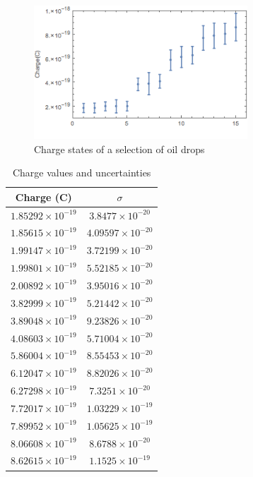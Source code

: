 \documentclass[aps, reprint,amsmath,amssymb]{revtex4-1} %
\begin{document}
\begin{figure}
\centering
\includegraphics[width=8cm]{errorBarPlot.png}
\caption{Charge states of a selection of oil drops}
\label{fig:chargeplot}
\end{figure}


\begin{table}
\begin{tabular}{ |c|c| } 
 \hline
 Charge (C) & $\sigma$ \\ \hline\hline
$1.85292\times10^{-19}$ & $3.8477\times10^{-20}$ \\
$1.85615\times10^{-19}$ & $4.09597\times10^{-20}$ \\
$1.99147\times10^{-19}$ & $3.72199\times10^{-20}$ \\
$1.99801\times10^{-19}$ & $5.52185\times10^{-20}$ \\
$2.00892\times10^{-19}$ & $3.95016\times10^{-20}$ \\
$3.82999\times10^{-19}$ & $5.21442\times10^{-20}$ \\
$3.89048\times10^{-19}$ & $9.23826\times10^{-20}$ \\
$4.08603\times10^{-19}$ & $5.71004\times10^{-20}$ \\
$5.86004\times10^{-19}$ & $8.55453\times10^{-20}$ \\
$6.12047\times10^{-19}$ & $8.82026\times10^{-20}$ \\
$6.27298\times10^{-19}$ & $7.3251\times10^{-20}$ \\
$7.72017\times10^{-19}$ & $1.03229\times10^{-19}$ \\
$7.89952\times10^{-19}$ & $1.05625\times10^{-19}$ \\
$8.06608\times10^{-19}$ & $8.6788\times10^{-20}$ \\
$8.62615\times10^{-19}$ & $1.1525\times10^{-19}$ \\ \hline
\end{tabular}
\caption{Charge values and uncertainties}
\label{fig:chargetable}
\end{table}
\end{document}
